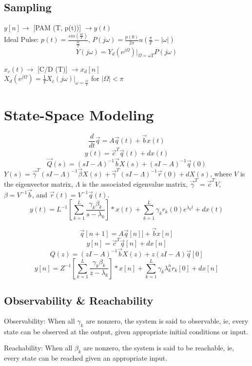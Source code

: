 \documentclass[8pt]{extarticle}
\begin{document}
\begin{multicols*}{3}
\begin{center}
\subsection{Sampling}
\( y[n] \rightarrow \) [PAM (T, p(t))] \( \rightarrow y(t) \) \\
Ideal Pulse: \( p(t) = \frac{sin(\frac{\pi t}{T})}{\frac{\pi t}{T}} \), \( P(j\omega) = \frac{p(0)}{2\pi} u(\frac{\pi}{T}-|\omega|) \) \\
\[ Y(j\omega) = Y_d(e^{j\Omega})|_{\Omega = \omega T} P(j\omega) \]

\( x_c(t) \rightarrow \) [C/D (T)] \( \rightarrow x_d[n] \) \\
\( X_d(e^{j\Omega}) = \frac{1}{T} X_c(j\omega)|_{\omega = \frac{\Omega}{T}} \) for \( |\Omega| < \pi \) \\

\section{State-Space Modeling}
\[ \frac{d}{dt} \vec{q} = A\vec{q}(t) + \vec{b}x(t) \]
\[ y(t) = \vec{c}^{T} \vec{q}(t) + dx(t) \]
\[ \vec{Q}(s) = (sI-A)^{-1}\vec{b}X(s) + (sI-A)^{-1}\vec{q}(0) \]
\( Y(s) = \vec{\gamma}^{T}(sI-\Lambda)^{-1}\vec{\beta}X(s) + \vec{\gamma}^{T}(sI-\Lambda)^{-1}\vec{r}(0) + dX(s) \),
where \( V \) is the eigenvector matrix, \( \Lambda \) is the associated eigenvalue matrix, \( \vec{\gamma}^{T} = \vec{c}^{T}V \), \( \beta = V^{-1}\vec{b} \), and \( \vec{r}(t) = V^{-1}\vec{q}(t) \). \\
\[ y(t) = L^{-1}[\sum_{k=1}^{L} \frac{\gamma_k \beta_k}{s-\lambda_k}] * x(t) + \sum_{k=1}^{L} \gamma_k r_k(0)e^{\lambda_k t} + dx(t) \]

\[ \vec{q}[n+1] = A\vec{q}[n]] + \vec{b}x[n] \]
\[ y[n] = \vec{c}^{T}\vec{q}[n] + dx[n] \]
\[ Q(z) = (zI-A)^{-1}\vec{b}X(z) + z(zI-A)\vec{q}[0] \]
\[ y[n] = Z^{-1}[\sum_{k=1}^{L} \frac{\gamma_k \beta_k}{z-\lambda_k}]*x[n] + \sum_{k=1}^{L} \gamma_k \lambda_k^{n} r_k[0] + dx[n] \]

\subsection{Observability \& Reachability}
Observability: When all \( \gamma_k \) are nonzero, the system is said to observable, ie, every state can be observed at the output, given appropriate initial conditions or input.

Reachability: When all \( \beta_k \) are nonzero, the system is said to be reachable, ie, every state can be reached given an appropriate input.


\end{center}
\end{multicols*}
\end{document}

